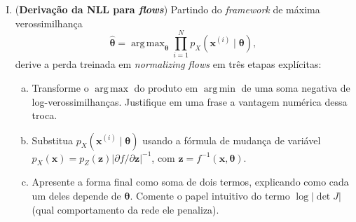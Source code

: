 \documentclass{dlproblemset}
\newcommand{\thetav}{\boldsymbol{\theta}}
\DeclareMathOperator*{\argmax}{arg\,max}
\DeclareMathOperator*{\argmin}{arg\,min}
\begin{document}
\begin{enumerate}[I)]

    \item (\textbf{Derivação da NLL para \textit{flows}}) Partindo do \textit{framework} de máxima verossimilhança
    \[
        \hat{\thetav} = \argmax_{\thetav}\prod_{i=1}^{N} p_X\!\left(\mathbf{x}^{(i)} \mid \thetav\right),
    \]
    derive a perda treinada em \textit{normalizing flows} em três etapas explícitas:
    \begin{enumerate}[(a)]
        \item Transforme o $\argmax$ do produto em $\argmin$ de uma soma negativa de log-verossimilhanças. Justifique em uma frase a vantagem numérica dessa troca.
        \item Substitua $p_X(\mathbf{x}^{(i)} \mid \thetav)$ usando a fórmula de mudança de variável $p_X(\mathbf{x}) = p_Z(\mathbf{z})\left|\partial f / \partial \mathbf{z}\right|^{-1}$, com $\mathbf{z} = f^{-1}(\mathbf{x}, \thetav)$.
        \item Apresente a forma final como soma de dois termos, explicando como cada um deles depende de $\thetav$. Comente o papel intuitivo do termo $\log|\det J|$ (qual comportamento da rede ele penaliza).
    \end{enumerate}


\end{enumerate}
\end{document}
